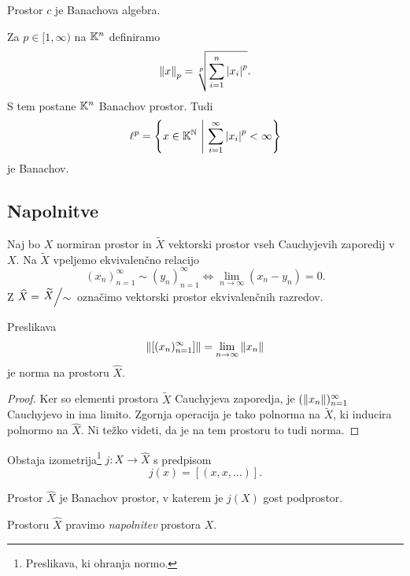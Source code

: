 \begin{opomba}
Prostor $c$ je Banachova algebra.
\end{opomba}

\begin{zgled}
Za $p \in [1, \infty)$ na $\mathbb{K}^n$ definiramo
\[
\left\lVert x\right\rVert_p = \sqrt[p]{\sum_{i=1}^n \left\lvert x_i\right\rvert^p}.
\]
S tem postane $\mathbb{K}^n$ Banachov prostor. Tudi
\[
\ell^p = \left\{x \in \mathbb{K}^{\mathbb{N}}~\middle\vert~\sum_{i=1}^\infty \left\lvert x_i\right\rvert^p < \infty\right\}
\]
je Banachov.
\end{zgled}

\newpage

\subsection{Napolnitve}

\begin{definicija}
Naj bo $X$ normiran prostor in $\widetilde{X}$ vektorski prostor
vseh Cauchyjevih zaporedij v $X$. Na $\widetilde{X}$ vpeljemo
ekvivalenčno relacijo
\[
(x_n)_{n=1}^\infty \sim (y_n)_{n=1}^\infty \iff
\lim_{n \to \infty} (x_n - y_n) = 0.
\]
Z $\widehat{X} = \kvoc{\widetilde{X}}{\sim}$ označimo vektorski
prostor ekvivalenčnih razredov.
\end{definicija}

\begin{trditev}
Preslikava
\[
\left\lVert [(x_n)_{n=1}^\infty]\right\rVert = \lim_{n \to \infty} \left\lVert x_n\right\rVert
\]
je norma na prostoru $\widehat{X}$.
\end{trditev}

\begin{proof}
Ker so elementi prostora $\widetilde{X}$ Cauchyjeva zaporedja, je
$(\left\lVert x_n\right\rVert)_{n=1}^\infty$ Cauchyjevo in ima limito. Zgornja
operacija je tako polnorma na $\widetilde{X}$, ki inducira polnormo
na $\widehat{X}$. Ni težko videti, da je na tem prostoru to tudi
norma.
\end{proof}

\begin{opomba}
Obstaja izometrija\footnote{Preslikava, ki ohranja normo.}
$j \colon X \to \widehat{X}$ s predpisom
\[
j(x) = [(x,x,\dots)].
\]
\end{opomba}

\begin{izrek}
Prostor $\widehat{X}$ je Banachov prostor, v katerem je $j(X)$ gost
podprostor.
\end{izrek}

\begin{opomba}
Prostoru $\widehat{X}$ pravimo
\emph{napolnitev} prostora $X$.
\end{opomba}

